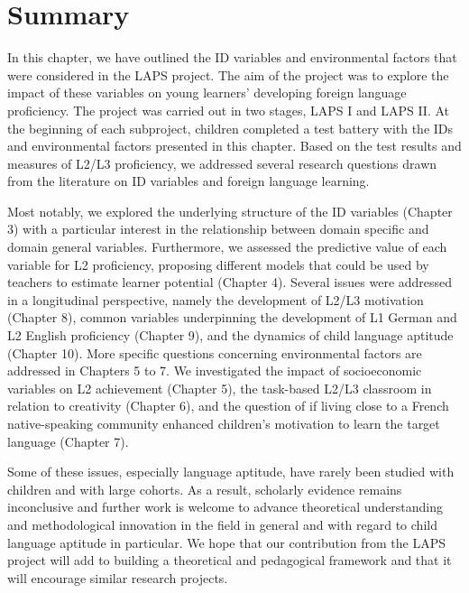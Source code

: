 \documentclass[output=paper]{langscibook}
\begin{document}
\section{Summary}

In this chapter, we have outlined the ID variables and environmental factors that were considered in the LAPS project. The aim of the project was to explore the impact of these variables on young learners’ developing foreign language proficiency. The project was carried out in two stages, LAPS I and LAPS II. At the beginning of each subproject, children completed a test battery with the IDs and environmental factors presented in this chapter. Based on the test results and measures of L2/L3 proficiency, we addressed several research questions drawn from the literature on ID variables and foreign language learning. 

Most notably, we explored the underlying structure of the ID variables (Chapter 3) with a particular interest in the relationship between domain specific and domain general variables. Furthermore, we assessed the predictive value of each variable for L2 proficiency, proposing different models that could be used by teachers to estimate learner potential (Chapter 4). Several issues were addressed in a longitudinal perspective, namely the development of L2/L3 motivation (Chapter 8), common variables underpinning the development of L1 German and L2 English proficiency (Chapter 9), and the dynamics of child language aptitude (Chapter 10). More specific questions concerning environmental factors are addressed in Chapters 5 to 7. We investigated the impact of socioeconomic variables on L2 achievement (Chapter 5), the task-based L2/L3 classroom in relation to creativity (Chapter 6), and the question of if living close to a French native-speaking community enhanced children’s motivation to learn the target language (Chapter 7).

Some of these issues, especially language aptitude, have rarely been studied with children and with large cohorts. As a result, scholarly evidence remains inconclusive and further work is welcome to advance theoretical understanding and methodological innovation in the field in general and with regard to child language aptitude in particular. We hope that our contribution from the LAPS project will add to building a theoretical and pedagogical framework and that it will encourage similar research projects. 

{\sloppy\printbibliography[heading=subbibliography,notkeyword=this]}
\end{document}
